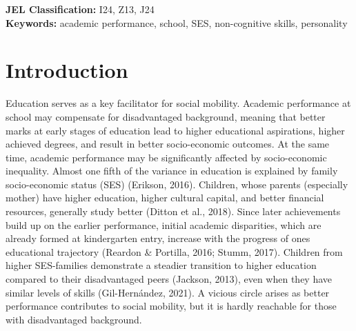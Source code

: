 \documentclass[
  12pt,
  a4paper,
]{article}
\newcommand{\jelandkeywords}[2]{
  \textbf{JEL Classification:} #1 \\
  \textbf{Keywords:} #2
}
\begin{document}
\jelandkeywords{I24, Z13, J24}{academic performance, school, SES, non-cognitive skills, personality}

\newpage
\setcounter{page}{3}

\hypertarget{introduction}{%
\section{Introduction}\label{introduction}}

Education serves as a key facilitator for social mobility. Academic
performance at school may compensate for disadvantaged background,
meaning that better marks at early stages of education lead to higher
educational aspirations, higher achieved degrees, and result in better
socio-economic outcomes. At the same time, academic performance may be
significantly affected by socio-economic inequality. Almost one fifth of
the variance in education is explained by family socio-economic status
(SES) (Erikson, 2016). Children, whose parents (especially mother) have
higher education, higher cultural capital, and better financial
resources, generally study better (Ditton et al., 2018). Since later
achievements build up on the earlier performance, initial academic
disparities, which are already formed at kindergarten entry, increase
with the progress of ones educational trajectory (Reardon \& Portilla,
2016; Stumm, 2017). Children from higher SES-families demonstrate a
steadier transition to higher education compared to their disadvantaged
peers (Jackson, 2013), even when they have similar levels of skills
(Gil-Hernández, 2021). A vicious circle arises as better performance
contributes to social mobility, but it is hardly reachable for those
with disadvantaged background.
\end{document}
